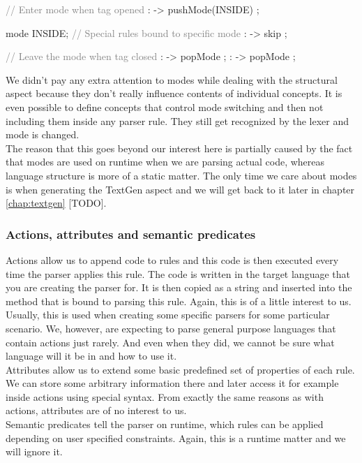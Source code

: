 \begin{antlr}
\textcolor{gray}{// Enter mode when tag opened}
        :   \literal{<}       -> pushMode(INSIDE) ;

mode INSIDE;
\textcolor{gray}{// Special rules bound to specific mode}
           :    -> skip ;

\textcolor{gray}{// Leave the mode when tag closed}
       :   \literal{>}       -> popMode ;
 :   \literal{/>}      -> popMode ;
\end{antlr}

We didn't pay any extra attention to modes while dealing with the structural aspect because they don't really influence contents of individual concepts. It is even possible to define concepts that control mode switching and then not including them inside any parser rule. They still get recognized by the lexer and mode is changed. 
\\

The reason that this goes beyond our interest here is partially caused by the fact that modes are used on runtime when we are parsing actual code, whereas language structure is more of a static matter. The only time we care about modes is when generating the TextGen aspect and we will get back to it later in chapter \ref{chap:textgen} [TODO].

\subsubsection{Actions, attributes and semantic predicates}

Actions allow us to append code to rules and this code is then executed every time the parser applies this rule. The code is written in the target language that you are creating the parser for. It is then copied as a string and inserted into the method that is bound to parsing this rule. Again, this is of a little interest to us. Usually, this is used when creating some specific parsers for some particular scenario. We, however, are expecting to parse general purpose languages that contain actions just rarely. And even when they did, we cannot be sure what language will it be in and how to use it.
\\

Attributes allow us to extend some basic predefined set of properties of each rule. We can store some arbitrary information there and later access it for example inside actions using special syntax. From exactly the same reasons as with actions, attributes are of no interest to us.
\\

Semantic predicates tell the parser on runtime, which rules can be applied depending on user specified constraints. Again, this is a runtime matter and we will ignore it.